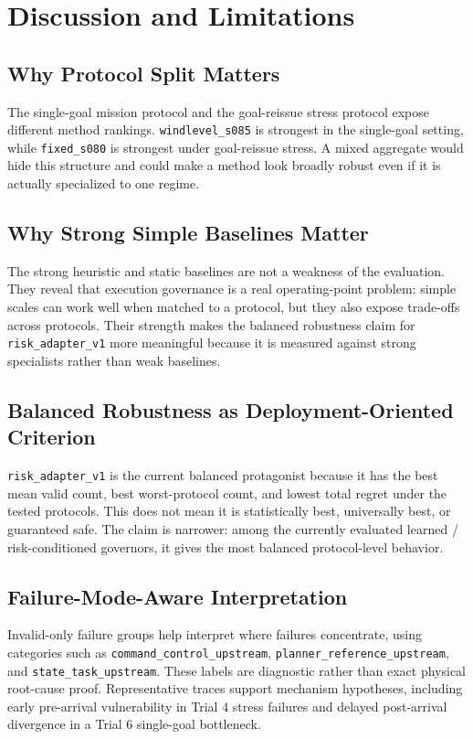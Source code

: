 \section{Discussion and Limitations}

\subsection{Why Protocol Split Matters}

The single-goal mission protocol and the goal-reissue stress protocol expose
different method rankings. \texttt{windlevel\_s085} is strongest in the
single-goal setting, while \texttt{fixed\_s080} is strongest under goal-reissue
stress. A mixed aggregate would hide this structure and could make a method
look broadly robust even if it is actually specialized to one regime.

\subsection{Why Strong Simple Baselines Matter}

The strong heuristic and static baselines are not a weakness of the evaluation.
They reveal that execution governance is a real operating-point problem:
simple scales can work well when matched to a protocol, but they also expose
trade-offs across protocols. Their strength makes the balanced robustness
claim for \texttt{risk\_adapter\_v1} more meaningful because it is measured
against strong specialists rather than weak baselines.

\subsection{Balanced Robustness as Deployment-Oriented Criterion}

\texttt{risk\_adapter\_v1} is the current balanced protagonist because it has
the best mean valid count, best worst-protocol count, and lowest total regret
under the tested protocols. This does not mean it is statistically best,
universally best, or guaranteed safe. The claim is narrower: among the
currently evaluated learned / risk-conditioned governors, it gives the most
balanced protocol-level behavior.

\subsection{Failure-Mode-Aware Interpretation}

Invalid-only failure groups help interpret where failures concentrate, using
categories such as \texttt{command\_control\_upstream},
\texttt{planner\_reference\_upstream}, and \texttt{state\_task\_upstream}.
These labels are diagnostic rather than exact physical root-cause proof.
Representative traces support mechanism hypotheses, including early
pre-arrival vulnerability in Trial 4 stress failures and delayed post-arrival
divergence in a Trial 6 single-goal bottleneck.

